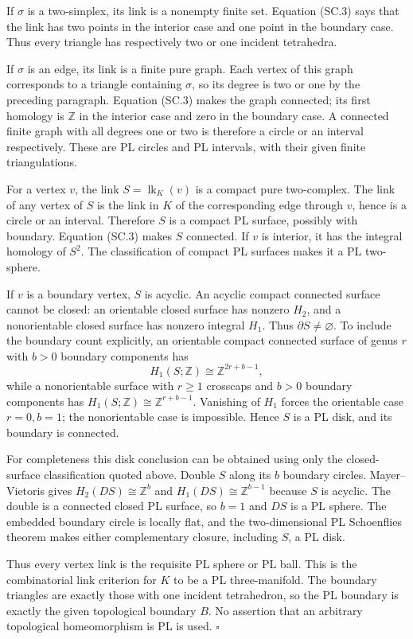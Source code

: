 If $\sigma$ is a two-simplex, its link is a nonempty finite set. Equation
(SC.3) says that the link has two points in the interior case and one point
in the boundary case. Thus every triangle has respectively two or one
incident tetrahedra.

If $\sigma$ is an edge, its link is a finite pure graph. Each vertex of this
graph corresponds to a triangle containing $\sigma$, so its degree is two
or one by the preceding paragraph. Equation (SC.3) makes the graph connected;
its first homology is $\mathbb Z$ in the interior case and zero in the
boundary case. A connected finite graph with all degrees one or two is
therefore a circle or an interval respectively. These are PL circles and
PL intervals, with their given finite triangulations.

For a vertex $v$, the link $S=\operatorname{lk}_K(v)$ is a compact pure
two-complex. The link of any vertex of $S$ is the link in $K$ of the
corresponding edge through $v$, hence is a circle or an interval. Therefore
$S$ is a compact PL surface, possibly with boundary. Equation (SC.3) makes
$S$ connected. If $v$ is interior, it has the integral homology of $S^2$.
The classification of compact PL surfaces makes it a PL two-sphere.

If $v$ is a boundary vertex, $S$ is acyclic. An acyclic compact connected
surface cannot be closed: an orientable closed surface has nonzero $H_2$,
and a nonorientable closed surface has nonzero integral $H_1$. Thus
$\partial S\ne\varnothing$. To include the boundary count explicitly, an
orientable compact connected surface of genus $r$ with $b>0$ boundary
components has
\[
 H_1(S;\mathbb Z)\cong\mathbb Z^{2r+b-1},
\]
while a nonorientable surface with $r\ge1$ crosscaps and $b>0$ boundary
components has $H_1(S;\mathbb Z)\cong\mathbb Z^{r+b-1}$.
Vanishing of $H_1$ forces the orientable case $r=0,b=1$; the nonorientable
case is impossible. Hence $S$ is a PL disk, and its boundary is connected.

For completeness this disk conclusion can be obtained using only the
closed-surface classification quoted above. Double $S$ along its $b$
boundary circles. Mayer--Vietoris gives $H_2(DS)\cong\mathbb Z^b$ and
$H_1(DS)\cong\mathbb Z^{b-1}$ because $S$ is acyclic. The double is a
connected closed PL surface, so $b=1$ and $DS$ is a PL sphere. The embedded
boundary circle is locally flat, and the two-dimensional PL Schoenflies
theorem makes either complementary closure, including $S$, a PL disk.

Thus every vertex link is the requisite PL sphere or PL ball. This is the
combinatorial link criterion for $K$ to be a PL three-manifold. The boundary
triangles are exactly those with one incident tetrahedron, so the PL boundary
is exactly the given topological boundary $B$. No assertion that an arbitrary
topological homeomorphism is PL is used. \hfill$\square$

